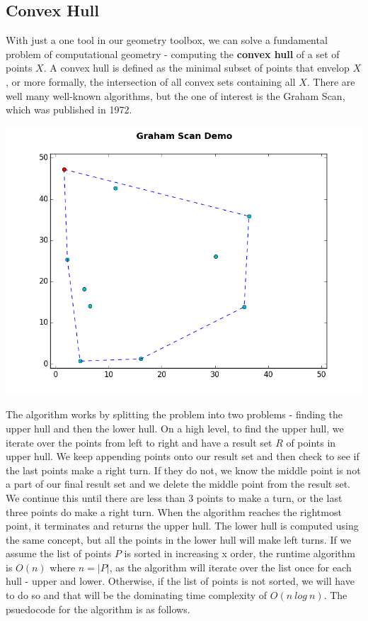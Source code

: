 \documentclass[12pt]{article}
\begin{document}
\begin{multicols}{2}
\subsection{Convex Hull}
\indent With just a one tool in our geometry toolbox, we can solve a fundamental problem of computational geometry - computing the \textbf{convex hull} of a set of points $X$. A convex hull is defined as the minimal subset of points that envelop $X$, or more formally, the intersection of all convex sets containing all $X$. There are well many well-known algorithms, but the one of interest is the Graham Scan, which was published in 1972. \newline \\
\centerline{\includegraphics[scale=0.4]{graham_scan.png}}
\indent The algorithm works by splitting the problem into two problems - finding the upper hull and then the lower hull. On a high level, to find the upper hull, we iterate over the points from left to right and have a result set $R$ of points in upper hull. We keep appending points onto our result set and then check to see if the last points make a right turn. If they do not, we know the middle point is not a part of our final result set and we delete the middle point from the result set. We continue this until there are less than 3 points to make a turn, or the last three points do make a right turn. When the algorithm reaches the rightmost point, it terminates and returns the upper hull. The lower hull is computed using the same concept, but all the points in the lower hull will make left turns. \newline
\indent If we assume the list of points $P$ is sorted in increasing x order, the runtime algorithm is $O(n)$ where $n = |P|$, as the algorithm will iterate over the list once for each hull - upper and lower. Otherwise, if the list of points is not sorted, we will have to do so and that will be the dominating time complexity of $O(n\ log\ n)$.  The psuedocode for the algorithm is as follows. \newline \\

\end{multicols}
\end{document}
